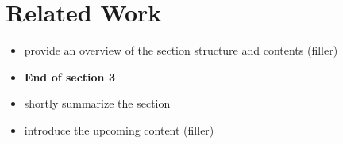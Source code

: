 \section{Related Work}

\begin{itemize}
  \item provide an overview of the section structure and contents (filler)
\end{itemize}







\begin{itemize}
  \item \textbf{End of section 3}
  \item shortly summarize the section
  \item introduce the upcoming content (filler)
\end{itemize}
